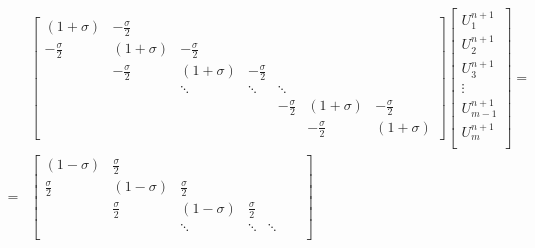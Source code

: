 \documentclass[../differential_methods.tex]{subfiles}
\begin{document}
\begin{align*}
	  & \begin{bmatrix}
		    (1+\sigma )        & -\frac{\sigma }{2} &                    &                    &                    &                    &                    \\
		    -\frac{\sigma }{2} & (1+\sigma )        & -\frac{\sigma }{2} &                    &                    &                    &                    \\
		                       & -\frac{\sigma }{2} & (1+\sigma )        & -\frac{\sigma }{2} &                    &                    &                    \\
		                       &                    & \ddots             & \ddots             & \ddots             &                    &                    \\
		                       &                    &                    &                    & -\frac{\sigma }{2} & (1+\sigma )        & -\frac{\sigma }{2} \\
		                       &                    &                    &                    &                    & -\frac{\sigma }{2} & (1+\sigma )
	    \end{bmatrix}\begin{bmatrix}
		                 U_{1}^{n+1}   \\
		                 U_{2}^{n+1}   \\
		                 U_{3}^{n+1}   \\
		                 \vdots        \\
		                 U_{m-1}^{n+1} \\
		                 U_{m}^{n+1}   \\
	                 \end{bmatrix} = \\
	= & \begin{bmatrix}
		    (1-\sigma )       & \frac{\sigma }{2} &                   &                   &                   &                   &                   \\
		    \frac{\sigma }{2} & (1-\sigma )       & \frac{\sigma }{2} &                   &                   &                   &                   \\
		                      & \frac{\sigma }{2} & (1-\sigma )       & \frac{\sigma }{2} &                   &                   &                   \\
		                      &                   & \ddots            & \ddots            & \ddots            &                   &                   \\

\end{bmatrix}
\end{align*}
\end{document}
